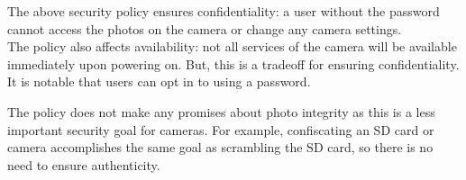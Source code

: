 \documentclass{article}
\begin{document}
\begin{homeworkProblem}[1]
    The above security policy ensures confidentiality: a user without the password cannot access the photos on the camera or change any camera settings. \\

    The policy also affects availability: not all services of the camera will be available immediately upon powering on. But, this is a tradeoff for ensuring confidentiality. It is notable that users can opt in to using a password.

    The policy does not make any promises about photo integrity as this is a less important security goal for cameras. For example, confiscating an SD card or camera accomplishes the same goal as scrambling the SD card, so there is no need to ensure authenticity.

  \end{homeworkProblem}
\end{document}
